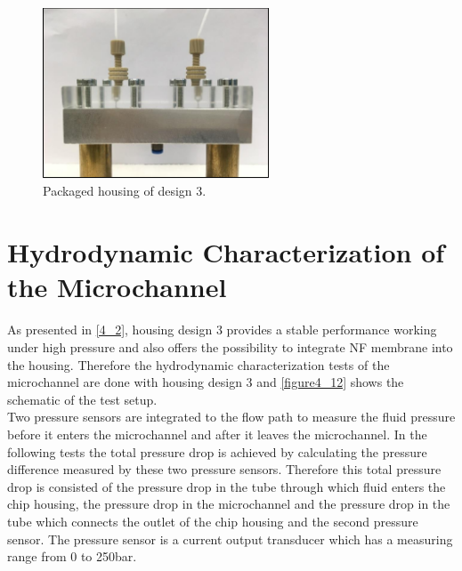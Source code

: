 \begin{figure}[h]%
\centering
\includegraphics[width=0.6\textwidth]{figures/packagingandtestunderhighpressure/figure4_11}%
\caption{Packaged housing of design 3.}%
\label{figure4_11}%
\end{figure}

\section{Hydrodynamic Characterization of the Microchannel}
\label{4_3}
As presented in \autoref{4_2}, housing design 3 provides a stable performance working under high pressure and also offers the possibility to integrate NF membrane into the housing. Therefore the hydrodynamic characterization tests of the microchannel are done with housing design 3 and \autoref{figure4_12} shows the schematic of the test setup.\\

Two pressure sensors are integrated to the flow path to measure the fluid pressure before it enters the microchannel and after it leaves the microchannel. In the following tests the total pressure drop is achieved by calculating the pressure difference measured by these two pressure sensors. Therefore this total pressure drop is consisted of the pressure drop in the tube through which fluid enters the chip housing, the pressure drop in the microchannel and the pressure drop in the tube which connects the outlet of the chip housing and the second pressure sensor. The pressure sensor is a current output transducer which has a measuring range from 0 to 250bar. \\
\clearpage

